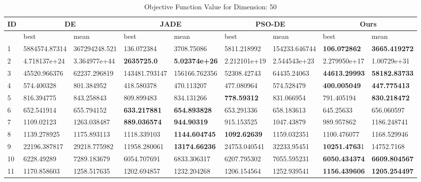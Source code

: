 \begingroup
\renewcommand\arraystretch{0.7}
\begin{table*}[t]
\centering
\caption{Objective Function Value for Dimension: 50}
 \begin{tabular}{|p{0.8cm}|p{1.6cm}|p{1.6cm}|p{1.6cm}|p{1.6cm}|p{1.6cm}|p{1.6cm}|p{1.6cm}|p{1.6cm}|} 
 \hline
 ID & \multicolumn{2}{c|}{DE} & \multicolumn{2}{c|}{JADE} & \multicolumn{2}{c|}{PSO-DE} & \multicolumn{2}{c|}{Ours} \\
 \hline
    & best & mean & best & mean & best & mean & best & mean \\ [0.5ex] 
 \hline
1  & 5884574.87314 & 367294248.521 & 136.072384 & 3708.75086 & 5811.218992 & 154233.646744 & \textbf{106.072862} & \textbf{3665.419272} \\ 
2  & 4.718137e+24 & 3.364977e+44 & \textbf{2635725.0} & \textbf{5.02374e+26} & 2.212101e+19 & 2.544543e+23 & 2.279950e+17 & 1.00729e+31 \\ 
3  & 45520.966376 & 62237.296819 & 143481.793147 & 156166.762356 & 52308.42743 & 64435.24063 & \textbf{44613.29993} & \textbf{58182.83733} \\
4  & 574.400328 & 801.384952 & 418.580378 & 470.113207 & 477.080964 & 574.528479 & \textbf{400.005049} & \textbf{447.775413} \\ 
5  & 816.394775 & 843.258843 & 809.899483 & 834.131266 & \textbf{778.59312} & 831.066954 & 791.405194 & \textbf{830.218472} \\ 
6  & 652.541914 & 655.794152 & \textbf{633.217881} & \textbf{654.893828} & 653.291336 & 658.183613 & 645.25633 & 656.060597 \\ 
7  & 1109.02123 & 1263.038487 & \textbf{889.036574} & \textbf{944.90319} & 915.153525 & 1047.43879 & 989.957862 & 1186.248741 \\ 
8  & 1139.278925 & 1175.893113 & 1118.339103 & \textbf{1144.604745} & \textbf{1092.62639} & 1159.032351 & 1100.476077 & 1168.529946 \\ 
9  & 22196.387817 & 29218.775982 & 11958.280061 & \textbf{13174.66236} & 24753.040541 & 32233.95451 & \textbf{10251.4763}1 & 14752.7168 \\ 
10  & 6228.49289 & 7289.183679 & 6054.707691 & 6833.306317 & 6207.795302 & 7055.595231 & \textbf{6050.434374} & \textbf{6609.804567} \\ 
11  & 1170.858603 & 1258.517635 & 1202.694857 & 1232.204268 & 1206.154564 & 1252.939541 & \textbf{1156.439606} & \textbf{1205.254497} \\ 

\end{tabular}
\end{table*}
